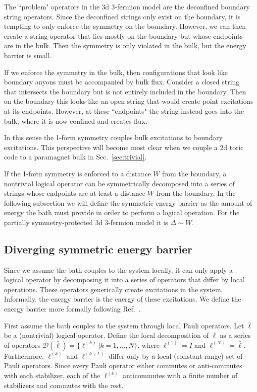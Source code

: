 \documentclass[twocolumn, longbibliography]{revtex4-2}
\renewcommand{\l}{\ell}
\begin{document}
The ``problem" operators in the 3d 3-fermion model are the deconfined boundary string operators. 
Since the deconfined strings only exist on the boundary, it is tempting to only enforce the symmetry on the boundary. However, we can then create a string operator that lies mostly on the boundary but whose endpoints are in the bulk. Then the symmetry is only violated in the bulk, but the energy barrier is small.

If we enforce the symmetry in the bulk, then configurations that look like boundary anyons must be accompanied by bulk flux. Consider a closed string that intersects the boundary but is not entirely included in the boundary. Then on the boundary this looks like an open string that would create point excitations at its endpoints. However, at these   ``endpoints" the string instead goes into the bulk, where it is now confined and creates flux.

In this sense the 1-form symmetry couples bulk excitations to boundary excitations. This perspective will become most clear when we couple a 2d toric code to a paramagnet bulk in Sec.~\ref{sec:trivial}.

If the 1-form symmetry is enforced to a distance $W$ from the boundary, a nontrivial logical operator can be symmetrically decomposed into a series of strings whose endpoints are at least a distance $W$ from the boundary. 
In the following subsection we will define the symmetric energy barrier as the amount of energy the bath must provide in order to perform a logical operation. For the partially symmetry-protected 3d 3-fermion model it is $\Delta\sim W$.

\subsection{Diverging symmetric energy barrier} \label{sub:ener}
	
Since we assume the bath couples to the system locally, it can only apply a logical operator by decomposing it into a series of operators that differ by local operations. These operators generically create excitations in the system. Informally, the energy barrier is the energy of these excitations. We define the energy barrier more formally following Ref.~\cite{RobertsBartlett}.
	
First assume the bath couples to the system through local Pauli operators. Let $\bar{\l}$ be a (nontrivial) logical operator. Define the local decomposition of $\bar{\l}$ as a series of operators $\mathcal{D}(\bar{\l}) = \{\l^{(k)}| k = 1,\dots,N\}$, where $\l^{(1)}=I$ and $\l^{(N)}=\bar{\l}$. Furthermore, $\l^{(k)}$ and $\l^{(k+1)}$ differ only by a local (constant-range) set of Pauli operators. Since every Pauli operator either commutes or anti-commutes with each stabilizer, each of the $\l^{(k)}$ anticommutes with a finite number of stabilizers and commutes with the rest.
	
\end{document}
